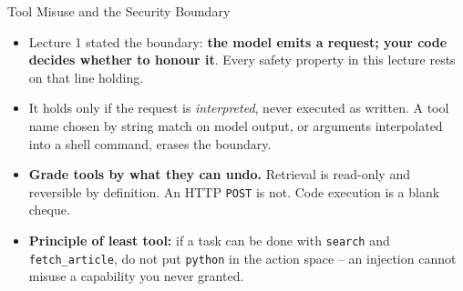 \begin{frame}{Tool Misuse and the Security Boundary}
\begin{itemize}
  \item Lecture 1 stated the boundary: \textbf{the model emits a request; your code decides whether to honour it}. Every safety property in this lecture rests on that line holding.
  \pause
  \item It holds only if the request is \emph{interpreted}, never executed as written. A tool name chosen by string match on model output, or arguments interpolated into a shell command, erases the boundary.
  \pause
  \item \textbf{Grade tools by what they can undo.} Retrieval is read-only and reversible by definition. An HTTP \texttt{POST} is not. Code execution is a blank cheque.
  \pause
  \item \textbf{Principle of least tool:} if a task can be done with \texttt{search} and \texttt{fetch\_article}, do not put \texttt{python} in the action space -- an injection cannot misuse a capability you never granted.
\end{itemize}
\end{frame}

